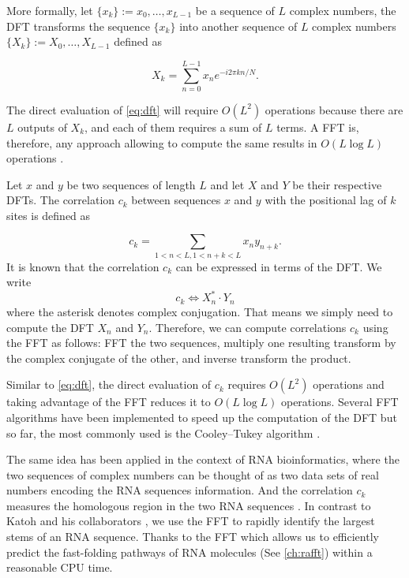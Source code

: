 More formally, let $\{x_k\} := x_0, \dots, x_{L-1}$ be a sequence of $L$ complex numbers, the \ac{DFT} transforms the sequence $\{x_k\}$ into another sequence of $L$ complex numbers $\{X_k\} := X_0, \dots, X_{L-1}$ defined as

\begin{equation} 
\label{eq:dft}
X_k = \sum_{n=0}^{L-1}{x_n e^{-i2\pi k n /N}}.
\end{equation} 

The direct evaluation of \autoref{eq:dft} will require $O(L^2)$ operations because there are $L$ outputs of $X_k$, and each of them requires a sum of $L$ terms. A \ac{FFT} is, therefore, any approach allowing to compute the same results in $O(L \log L)$ operations \cite{johnson2006modified}.

Let $x$ and $y$ be two sequences of length $L$ and let $X$ and $Y$ be their respective \acp{DFT}. The correlation $c_k$ between sequences $x$ and $y$ with the positional lag of $k$ sites is defined as 

\begin{equation} 
\label{eq:correlation}
c_k = \sum_{1<n<L, 1<n+k<L}{x_ny_{n+k}}.
\end{equation} 
It is known that the correlation $c_k$ can be expressed in terms of the \ac{DFT}. We write 
\begin{equation}
\label{eq:conv}
c_k \Leftrightarrow X^*_n \cdot Y_n
\end{equation}
where the asterisk denotes complex conjugation. That means we simply need to compute the \ac{DFT} $X_n$ and $Y_n$. Therefore, we can compute correlations $c_k$ using the \ac{FFT} as follows: \ac{FFT} the two sequences, multiply one resulting transform by the complex conjugate of the other, and inverse transform the product.

Similar to \autoref{eq:dft}, the direct evaluation of $c_k$ requires $O(L^2)$ operations and taking advantage of the \ac{FFT} reduces it to $O(L \log L)$ operations. Several \ac{FFT} algorithms have been implemented to speed up the computation of the \ac{DFT}
but so far, the most commonly used is the Cooley–Tukey algorithm \cite{cooley1965algorithm}. 

The same idea has been applied in the context of \ac{RNA} bioinformatics, where the two sequences of complex numbers can be thought of as two data sets of real numbers encoding the \ac{RNA} sequences information. And the correlation $c_k$ measures the homologous region in the two \ac{RNA} sequences  \cite{katoh02_mafft}. In contrast to Katoh and his collaborators \cite{katoh02_mafft}, we use the \ac{FFT} to rapidly identify the largest stems of an \ac{RNA} sequence. Thanks to the \ac{FFT} which allows us to efficiently predict the fast-folding pathways of \ac{RNA} molecules (See \autoref{ch:rafft}) within a reasonable \ac{CPU} time.

